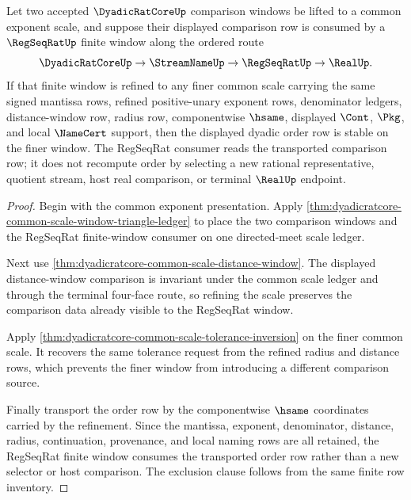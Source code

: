 \begin{theorem}
\label{thm:dyadicratcore-common-scale-order-refinement}
Let two accepted $\DyadicRatCoreUp$ comparison windows be lifted to a common exponent scale, and suppose their displayed comparison row is consumed by a $\RegSeqRatUp$ finite window along the ordered route
$$
\DyadicRatCoreUp \to \StreamNameUp \to \RegSeqRatUp \to \RealUp .
$$
If that finite window is refined to any finer common scale carrying the same signed mantissa rows, refined positive-unary exponent rows, denominator ledgers, distance-window row, radius row, componentwise $\hsame$, displayed $\Cont$, $\Pkg$, and local $\NameCert$ support, then the displayed dyadic order row is stable on the finer window. The RegSeqRat consumer reads the transported comparison row; it does not recompute order by selecting a new rational representative, quotient stream, host real comparison, or terminal $\RealUp$ endpoint.
\end{theorem}
\begin{proof}
Begin with the common exponent presentation. Apply \autoref{thm:dyadicratcore-common-scale-window-triangle-ledger} to place the two comparison windows and the RegSeqRat finite-window consumer on one directed-meet scale ledger.

Next use \autoref{thm:dyadicratcore-common-scale-distance-window}. The displayed distance-window comparison is invariant under the common scale ledger and through the terminal four-face route, so refining the scale preserves the comparison data already visible to the RegSeqRat window.

Apply \autoref{thm:dyadicratcore-common-scale-tolerance-inversion} on the finer common scale. It recovers the same tolerance request from the refined radius and distance rows, which prevents the finer window from introducing a different comparison source.

Finally transport the order row by the componentwise $\hsame$ coordinates carried by the refinement. Since the mantissa, exponent, denominator, distance, radius, continuation, provenance, and local naming rows are all retained, the RegSeqRat finite window consumes the transported order row rather than a new selector or host comparison. The exclusion clause follows from the same finite row inventory.
\end{proof}

